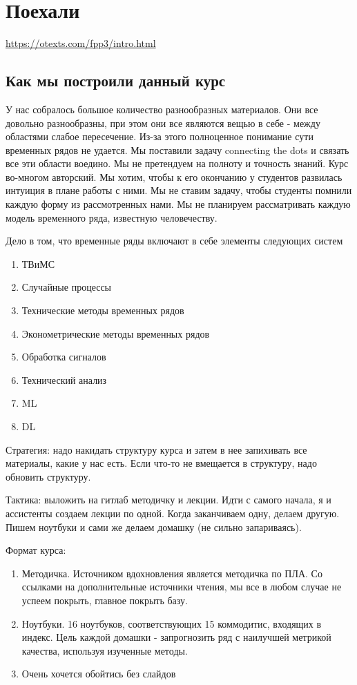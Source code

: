 \chapter{Поехали}
\url{https://otexts.com/fpp3/intro.html}

\section{Как мы построили данный курс}

У нас собралось большое количество разнообразных материалов.
Они все довольно разнообразны, при этом они все являются вещью в себе
- между областями слабое пересечение.
Из-за этого полноценное понимание сути временных рядов не удается.
Мы поставили задачу connecting the dots и связать все эти области воедино.
Мы не претендуем на полноту и точность знаний. Курс во-многом авторский.
Мы хотим, чтобы к его окончанию у студентов развилась интуиция в
плане работы с ними.
Мы не ставим задачу, чтобы студенты помнили каждую форму из рассмотренных нами.
Мы не планируем рассматривать каждую модель временного ряда,
известную человечеству.

Дело в том, что временные ряды включают в себе элементы следующих систем

\begin{enumerate}
  \item ТВиМС
  \item Случайные процессы
  \item Технические методы временных рядов
  \item Эконометрические методы временных рядов
  \item Обработка сигналов
  \item Технический анализ
  \item ML
  \item DL
\end{enumerate}

Стратегия: надо накидать структуру курса и затем в нее запихивать
все материалы, какие у нас есть. Если что-то не вмещается в
структуру, надо обновить структуру.

Тактика: выложить на гитлаб методичку и лекции. Идти с самого начала,
я и ассистенты создаем лекции по одной. Когда заканчиваем одну,
делаем другую. Пишем ноутбуки и сами же делаем домашку (не сильно запариваясь).

Формат курса:

\begin{enumerate}
  \item Методичка. Источником вдохновления является методичка по ПЛА.
    Со ссылками на дополнительные источники чтения, мы все в любом
    случае не успеем покрыть, главное покрыть базу.
  \item Ноутбуки. 16 ноутбуков, соответствующих 15 коммодитис,
    входящих в индекс. Цель каждой домашки - запрогнозить ряд с
    наилучшей метрикой качества, используя изученные методы.
  \item Очень хочется обойтись без слайдов
\end{enumerate}


